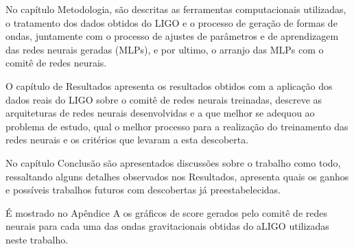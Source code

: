 No capítulo Metodologia, são descritas as ferramentas computacionais utilizadas, o tratamento dos dados obtidos do LIGO e o processo de geração de formas de ondas, juntamente com o processo de ajustes de parâmetros e de aprendizagem das redes neurais geradas (MLPs), e por ultimo, o arranjo das MLPs com o comitê de redes neurais.

O capítulo de Resultados apresenta os resultados obtidos com a aplicação dos dados reais do LIGO sobre o comitê de redes neurais treinadas, descreve as arquiteturas de redes neurais desenvolvidas e a que melhor se adequou ao problema de estudo, qual o melhor processo para a realização do treinamento das redes neurais e os critérios que levaram a esta descoberta.

No capítulo Conclusão são apresentados discussões sobre o trabalho como todo, ressaltando alguns detalhes observados nos Resultados, apresenta quais os ganhos e possíveis trabalhos futuros com descobertas já preestabelecidas.

É mostrado no Apêndice A os gráficos de score gerados pelo comitê de redes neurais para cada uma das ondas gravitacionais obtidas do aLIGO utilizadas neste trabalho.